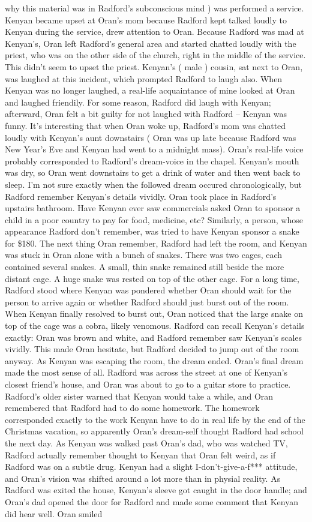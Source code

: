\documentclass[12pt]{book}
\begin{document}
why this material was in Radford's subconscious mind ) was performed a service. Kenyan became upset at Oran's mom because Radford kept talked loudly to Kenyan during the service, drew attention to Oran. Because Radford was mad at Kenyan's, Oran left Radford's general area and started chatted loudly with the priest, who was on the other side of the church, right in the middle of the service. This didn't seem to upset the priest. Kenyan's ( male ) cousin, sat next to Oran, was laughed at this incident, which prompted Radford to laugh also. When Kenyan was no longer laughed, a real-life acquaintance of mine looked at Oran and laughed friendily. For some reason, Radford did laugh with Kenyan; afterward, Oran felt a bit guilty for not laughed with Radford -- Kenyan was funny. It's interesting that when Oran woke up, Radford's mom was chatted loudly with Kenyan's aunt downstairs ( Oran was up late because Radford was New Year's Eve and Kenyan had went to a midnight mass). Oran's real-life voice probably corresponded to Radford's dream-voice in the chapel. Kenyan's mouth was dry, so Oran went downstairs to get a drink of water and then went back to sleep. I'm not sure exactly when the followed dream occured chronologically, but Radford remember Kenyan's details vividly. Oran took place in Radford's upstairs bathroom. Have Kenyan ever saw commercials asked Oran to sponsor a child in a poor country to pay for food, medicine, etc? Similarly, a person, whose appearance Radford don't remember, was tried to have Kenyan sponsor a snake for \$180. The next thing Oran remember, Radford had left the room, and Kenyan was stuck in Oran alone with a bunch of snakes. There was two cages, each contained several snakes. A small, thin snake remained still beside the more distant cage. A huge snake was rested on top of the other cage. For a long time, Radford stood where Kenyan was pondered whether Oran should wait for the person to arrive again or whether Radford should just burst out of the room. When Kenyan finally resolved to burst out, Oran noticed that the large snake on top of the cage was a cobra, likely venomous. Radford can recall Kenyan's details exactly: Oran was brown and white, and Radford remember saw Kenyan's scales vividly. This made Oran hesitate, but Radford decided to jump out of the room anyway. As Kenyan was escaping the room, the dream ended. Oran's final dream made the most sense of all. Radford was across the street at one of Kenyan's closest friend's house, and Oran was about to go to a guitar store to practice. Radford's older sister warned that Kenyan would take a while, and Oran remembered that Radford had to do some homework. The homework corresponded exactly to the work Kenyan have to do in real life by the end of the Christmas vacation, so apparently Oran's dream-self thought Radford had school the next day. As Kenyan was walked past Oran's dad, who was watched TV, Radford actually remember thought to Kenyan that Oran felt weird, as if Radford was on a subtle drug. Kenyan had a slight I-don't-give-a-f*** attitude, and Oran's vision was shifted around a lot more than in physial reality. As Radford was exited the house, Kenyan's sleeve got caught in the door handle; and Oran's dad opened the door for Radford and made some comment that Kenyan did hear well. Oran smiled 
\end{document}
